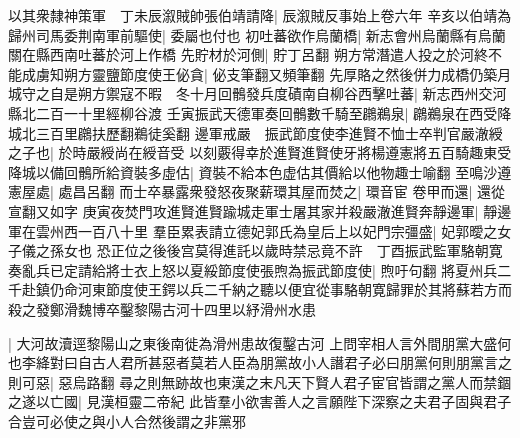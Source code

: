 以其衆隸神策軍　丁未辰溆賊帥張伯靖請降|{
	辰溆賊反事始上卷六年}
辛亥以伯靖為歸州司馬委荆南軍前驅使|{
	委屬也付也}
初吐蕃欲作烏蘭橋|{
	新志會州烏蘭縣有烏蘭關在縣西南吐蕃於河上作橋}
先貯材於河側|{
	貯丁呂翻}
朔方常潛遣人投之於河終不能成虜知朔方靈鹽節度使王佖貪|{
	佖支筆翻又頻筆翻}
先厚賂之然後併力成橋仍築月城守之自是朔方禦寇不暇　冬十月回鶻發兵度磧南自柳谷西擊吐蕃|{
	新志西州交河縣北二百一十里經柳谷渡}
壬寅振武天德軍奏回鶻數千騎至鸊鵜泉|{
	鸊鵜泉在西受降城北三百里鸊扶歷翻鵜徒奚翻}
邊軍戒嚴　振武節度使李進賢不恤士卒判官嚴澈綬之子也|{
	於時嚴綬尚在綬音受}
以刻覈得幸於進賢進賢使牙將楊遵憲將五百騎趣東受降城以備回鶻所給資裝多虛估|{
	資裝不給本色虚估其價給以他物趣士喻翻}
至鳴沙遵憲屋處|{
	處昌呂翻}
而士卒暴露衆發怒夜聚薪環其屋而焚之|{
	環音宦}
卷甲而還|{
	還從宣翻又如字}
庚寅夜焚門攻進賢進賢踰城走軍士屠其家并殺嚴澈進賢奔靜邊軍|{
	靜邊軍在雲州西一百八十里}
羣臣累表請立德妃郭氏為皇后上以妃門宗彊盛|{
	妃郭曖之女子儀之孫女也}
恐正位之後後宫莫得進託以歲時禁忌竟不許　丁酉振武監軍駱朝寛奏亂兵已定請給將士衣上怒以夏綏節度使張煦為振武節度使|{
	煦吁句翻}
將夏州兵二千赴鎮仍命河東節度使王鍔以兵二千納之聽以便宜從事駱朝寛歸罪於其將蘇若方而殺之發鄭滑魏博卒鑿黎陽古河十四里以紓滑州水患

|{
	大河故瀆逕黎陽山之東後南徙為滑州患故復鑿古河}
上問宰相人言外間朋黨大盛何也李絳對曰自古人君所甚惡者莫若人臣為朋黨故小人譖君子必曰朋黨何則朋黨言之則可惡|{
	惡烏路翻}
尋之則無跡故也東漢之末凡天下賢人君子宦官皆謂之黨人而禁錮之遂以亡國|{
	見漢桓靈二帝紀}
此皆羣小欲害善人之言願陛下深察之夫君子固與君子合豈可必使之與小人合然後謂之非黨邪

